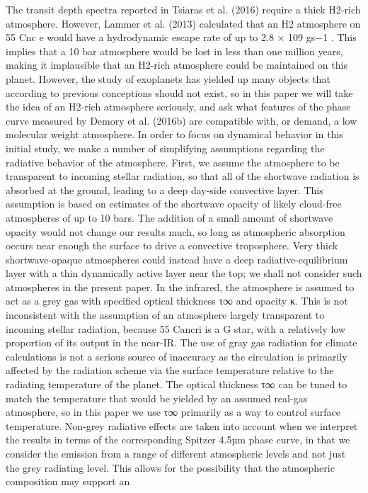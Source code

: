 The transit depth spectra reported in Tsiaras et al.
(2016) require a thick H2-rich atmosphere. However,
Lammer et al. (2013) calculated that an H2 atmosphere
on 55 Cnc e would have a hydrodynamic escape rate
of up to 2.8 × 109 gs−1
. This implies that a 10 bar
atmosphere would be lost in less than one million years,
making it implausible that an H2-rich atmosphere could
be maintained on this planet. However, the study of
exoplanets has yielded up many objects that according
to previous conceptions should not exist, so in this paper
we will take the idea of an H2-rich atmosphere seriously,
and ask what features of the phase curve measured by
Demory et al. (2016b) are compatible with, or demand,
a low molecular weight atmosphere.
In order to focus on dynamical behavior in this initial
study, we make a number of simplifying assumptions regarding the radiative behavior of the atmosphere. First,
we assume the atmosphere to be transparent to incoming
stellar radiation, so that all of the shortwave radiation is
absorbed at the ground, leading to a deep day-side convective layer. This assumption is based on estimates of
the shortwave opacity of likely cloud-free atmospheres
of up to 10 bars. The addition of a small amount of
shortwave opacity would not change our results much,
so long as atmospheric absorption occurs near enough
the surface to drive a convective troposphere. Very
thick shortwave-opaque atmospheres could instead have
a deep radiative-equilibrium layer with a thin dynamically active layer near the top; we shall not consider
such atmospheres in the present paper.
In the infrared, the atmosphere is assumed to act as
a grey gas with specified optical thickness τ∞ and opacity κ. This is not inconsistent with the assumption of
an atmosphere largely transparent to incoming stellar
radiation, because 55 Cancri is a G star, with a relatively low proportion of its output in the near-IR. The
use of gray gas radiation for climate calculations is not
a serious source of inaccuracy as the circulation is primarily affected by the radiation scheme via the surface
temperature relative to the radiating temperature of the
planet. The optical thickness τ∞ can be tuned to match
the temperature that would be yielded by an assumed
real-gas atmosphere, so in this paper we use τ∞ primarily as a way to control surface temperature.
Non-grey radiative effects are taken into account when
we interpret the results in terms of the corresponding
Spitzer 4.5µm phase curve, in that we consider the emission from a range of different atmospheric levels and not
just the grey radiating level. This allows for the possibility that the atmospheric composition may support an

